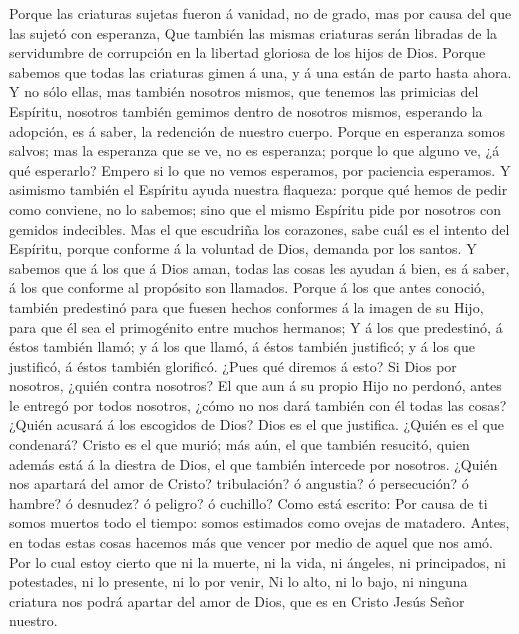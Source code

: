 Porque las criaturas sujetas fueron á vanidad, no de
grado, mas por causa del que las sujetó con esperanza,  Que
también las mismas criaturas serán libradas de la servidumbre de
corrupción en la libertad gloriosa de los hijos de Dios. 
Porque sabemos que todas las criaturas gimen á una, y á una están de
parto hasta ahora.  Y no sólo ellas, mas también nosotros
mismos, que tenemos las primicias del Espíritu, nosotros también gemimos
dentro de nosotros mismos, esperando la adopción, es á saber, la
redención de nuestro cuerpo.  Porque en esperanza somos
salvos; mas la esperanza que se ve, no es esperanza; porque lo que
alguno ve, ¿á qué esperarlo?  Empero si lo que no vemos
esperamos, por paciencia esperamos.  Y asimismo también el
Espíritu ayuda nuestra flaqueza: porque qué hemos de pedir como
conviene, no lo sabemos; sino que el mismo Espíritu pide por nosotros
con gemidos indecibles.  Mas el que escudriña los
corazones, sabe cuál es el intento del Espíritu, porque conforme á la
voluntad de Dios, demanda por los santos.  Y sabemos que á
los que á Dios aman, todas las cosas les ayudan á bien, es á saber, á
los que conforme al propósito son llamados.  Porque á los
que antes conoció, también predestinó para que fuesen hechos conformes á
la imagen de su Hijo, para que él sea el primogénito entre muchos
hermanos;  Y á los que predestinó, á éstos también llamó; y
á los que llamó, á éstos también justificó; y á los que justificó, á
éstos también glorificó.  ¿Pues qué diremos á esto? Si Dios
por nosotros, ¿quién contra nosotros?  El que aun á su
propio Hijo no perdonó, antes le entregó por todos nosotros, ¿cómo no
nos dará también con él todas las cosas?  ¿Quién acusará á
los escogidos de Dios? Dios es el que justifica.  ¿Quién es
el que condenará? Cristo es el que murió; más aún, el que también
resucitó, quien además está á la diestra de Dios, el que también
intercede por nosotros.  ¿Quién nos apartará del amor de
Cristo? tribulación? ó angustia? ó persecución? ó hambre? ó desnudez? ó
peligro? ó cuchillo?  Como está escrito: Por causa de ti
somos muertos todo el tiempo: somos estimados como ovejas de matadero.
 Antes, en todas estas cosas hacemos más que vencer por
medio de aquel que nos amó.  Por lo cual estoy cierto que
ni la muerte, ni la vida, ni ángeles, ni principados, ni potestades, ni
lo presente, ni lo por venir,  Ni lo alto, ni lo bajo, ni
ninguna criatura nos podrá apartar del amor de Dios, que es en Cristo
Jesús Señor nuestro.


